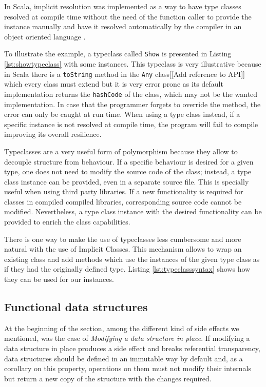 \documentclass[../main.tex]{subfiles}
\begin{document}
In Scala, implicit resolution was implemented as a way to have type classes
resolved at compile time without the need of the function caller to provide the
instance manually and have it resolved automatically by the compiler in an
object oriented language \autocite{Oliveira2010TypeImplicits}.

To illustrate the example, a typeclass called \texttt{Show} is presented in
Listing \ref{lst:showtypeclass} with some instances. This typeclass is very
illustrative because in Scala there is a \texttt{toString} method in the
\texttt{Any} class[[Add reference to API]] which every class must extend but it
is very error prone as its default implementation returns the \texttt{hashCode} of the
class, which may not be the wanted implementation. In case that the programmer
forgets to override the method, the error can only be caught at run time. When
using a type class instead, if a specific instance is not resolved at compile time, the
program will fail to compile improving its overall resilience.



Typeclasses are a very useful form of polymorphism because they allow to decouple structure from
behaviour. If a specific behaviour is desired for a given type, one does not need
to modify the source code of the class; instead, a type class instance can be provided, even 
in a separate source file. This is specially useful when using third party
libraries. If a new functionality is required for classes in compiled compiled libraries,
corresponding source code cannot be modified. Nevertheless, a type class instance
with the desired functionality can be provided to enrich the class capabilities.

There is one way to make the use of typeclasses less cumbersome and more natural
with the use of Implicit Classes. This mechanism allows to wrap an existing
class and add methods which use the instances of the given type class as if they
had the originally defined type. Listing \ref{lst:typeclasssyntax}
shows how they can be used for our instances.


\subsection{Functional data structures} At the beginning of the section, among
the different kind of side effects we mentioned, was the case of \textit{Modifying a
data structure in place}. If modifying a data structure in place produces a side
effect and breaks referential transparency, data structures should be defined in an
immutable way by default and, as a corollary on this property, operations on them
must not modify their internals but return a new copy of the structure with the changes required.
\end{document}
